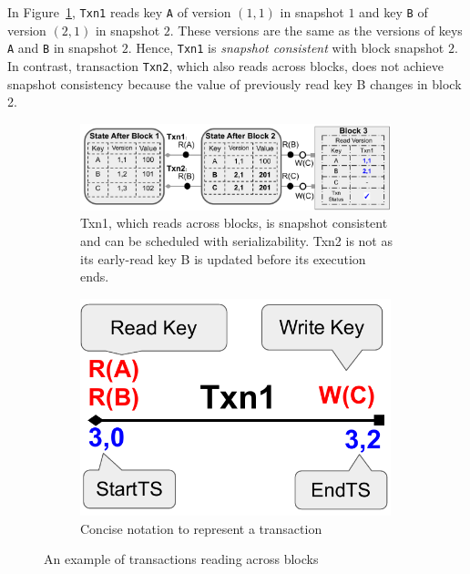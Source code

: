 \begin{example}
  \label{example:txn:acrossBlk}
  In Figure~\ref{diagram:txn:theory_snapshot}, \texttt{Txn1} reads key
  \texttt{A} of version $(1,1)$ in snapshot $1$ and key \texttt{B} of
  version $(2,1)$ in snapshot $2$.
  These versions are the same as the versions of keys \texttt{A} and \texttt{B} in snapshot $2$.
  Hence, \texttt{Txn1} is \textit{snapshot consistent} with block snapshot $2$.
  In contrast, transaction \texttt{Txn2}, which also reads across blocks, does
  not achieve snapshot consistency because the value of previously read key B
  changes in block 2.
\end{example}


\begin{figure}[tp] \centering
  \begin{subfigure}{0.7\textwidth}
    \includegraphics[width=0.99\textwidth]{diagram/txn/theory_snapshot.pdf}
    \caption{Txn1, which reads across blocks, is snapshot consistent and can be
    scheduled with serializability. Txn2 is not as its early-read key B
    is updated before its execution ends.}
    \label{diagram:txn:theory_snapshot}
  \end{subfigure}\hfill
  \begin{subfigure}{0.27\textwidth}
    \includegraphics[width=0.99\textwidth]{diagram/txn/theory_notation.pdf}
    \caption{Concise notation to represent a transaction}
    \label{diagram:txn:theory_notation}
  \end{subfigure}
  \caption{An example of transactions reading across blocks}
\end{figure}

